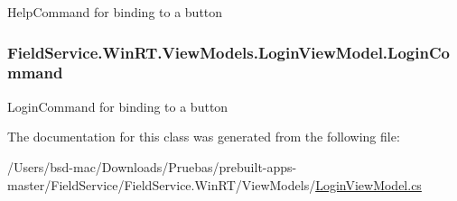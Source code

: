 Help\+Command for binding to a button 

\hypertarget{class_field_service_1_1_win_r_t_1_1_view_models_1_1_login_view_model_a7f538df7a720adab9196d2de3bb86b3a}{
\subsubsection[{Login\+Command}]{ Field\+Service.\+Win\+R\+T.\+View\+Models.\+Login\+View\+Model.\+Login\+Command\hspace{0.3cm}{\ttfamily [get]}}}\label{class_field_service_1_1_win_r_t_1_1_view_models_1_1_login_view_model_a7f538df7a720adab9196d2de3bb86b3a}


Login\+Command for binding to a button 



The documentation for this class was generated from the following file\+:\begin{DoxyCompactItemize}
\item 
/\+Users/bsd-\/mac/\+Downloads/\+Pruebas/prebuilt-\/apps-\/master/\+Field\+Service/\+Field\+Service.\+Win\+R\+T/\+View\+Models/\hyperlink{_win_r_t_2_view_models_2_login_view_model_8cs}{Login\+View\+Model.\+cs}\end{DoxyCompactItemize}
